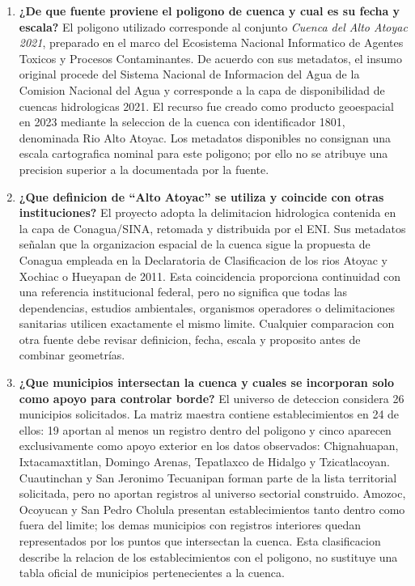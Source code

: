 \documentclass[11pt,letterpaper]{article}
\begin{document}
\begin{enumerate}
    \item \textbf{¿De que fuente proviene el poligono de cuenca y cual es su fecha y escala?}
    El poligono utilizado corresponde al conjunto \textit{Cuenca del Alto Atoyac 2021}, preparado en el marco del Ecosistema Nacional Informatico de Agentes Toxicos y Procesos Contaminantes. De acuerdo con sus metadatos, el insumo original procede del Sistema Nacional de Informacion del Agua de la Comision Nacional del Agua y corresponde a la capa de disponibilidad de cuencas hidrologicas 2021. El recurso fue creado como producto geoespacial en 2023 mediante la seleccion de la cuenca con identificador 1801, denominada Rio Alto Atoyac. Los metadatos disponibles no consignan una escala cartografica nominal para este poligono; por ello no se atribuye una precision superior a la documentada por la fuente.

    \item \textbf{¿Que definicion de ``Alto Atoyac'' se utiliza y coincide con otras instituciones?}
    El proyecto adopta la delimitacion hidrologica contenida en la capa de Conagua/SINA, retomada y distribuida por el ENI. Sus metadatos señalan que la organizacion espacial de la cuenca sigue la propuesta de Conagua empleada en la Declaratoria de Clasificacion de los rios Atoyac y Xochiac o Hueyapan de 2011. Esta coincidencia proporciona continuidad con una referencia institucional federal, pero no significa que todas las dependencias, estudios ambientales, organismos operadores o delimitaciones sanitarias utilicen exactamente el mismo limite. Cualquier comparacion con otra fuente debe revisar definicion, fecha, escala y proposito antes de combinar geometrías.

    \item \textbf{¿Que municipios intersectan la cuenca y cuales se incorporan solo como apoyo para controlar borde?}
    El universo de deteccion considera 26 municipios solicitados. La matriz maestra contiene establecimientos en 24 de ellos: 19 aportan al menos un registro dentro del poligono y cinco aparecen exclusivamente como apoyo exterior en los datos observados: Chignahuapan, Ixtacamaxtitlan, Domingo Arenas, Tepatlaxco de Hidalgo y Tzicatlacoyan. Cuautinchan y San Jeronimo Tecuanipan forman parte de la lista territorial solicitada, pero no aportan registros al universo sectorial construido. Amozoc, Ocoyucan y San Pedro Cholula presentan establecimientos tanto dentro como fuera del limite; los demas municipios con registros interiores quedan representados por los puntos que intersectan la cuenca. Esta clasificacion describe la relacion de los establecimientos con el poligono, no sustituye una tabla oficial de municipios pertenecientes a la cuenca.


\end{enumerate}
\end{document}
